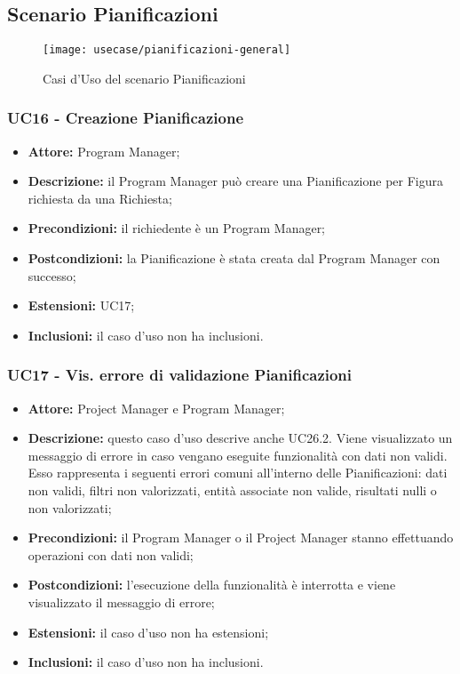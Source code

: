 \subsection{Scenario Pianificazioni}
\begin{figure}[H] 
	\centering
    \texttt{[image: usecase/pianificazioni-general]} 
    \caption{Casi d'Uso del scenario Pianificazioni}
\end{figure}

\subsubsection*{UC16 - Creazione Pianificazione}
\begin{itemize}[label=$\circ$]
\item \textbf{Attore:} Program Manager;
\item \textbf{Descrizione:} il Program Manager può creare una Pianificazione per Figura richiesta da una Richiesta;
\item \textbf{Precondizioni:} il richiedente è un Program Manager;
\item \textbf{Postcondizioni:} la Pianificazione è stata creata dal Program Manager con successo;
\item \textbf{Estensioni:} UC17;
\item \textbf{Inclusioni:} il caso d'uso non ha inclusioni.
\end{itemize}

\subsubsection*{UC17 - Vis. errore di validazione Pianificazioni}
\begin{itemize}[label=$\circ$]
\item \textbf{Attore:} Project Manager e Program Manager;
\item \textbf{Descrizione:} questo caso d'uso descrive anche UC26.2. Viene visualizzato un messaggio di errore in caso vengano eseguite funzionalità con dati non validi. Esso rappresenta i seguenti errori comuni all'interno delle Pianificazioni: dati non validi, filtri non valorizzati, entità associate non valide, risultati nulli o non valorizzati;
\item \textbf{Precondizioni:} il Program Manager o il Project Manager stanno effettuando operazioni con dati non validi;
\item \textbf{Postcondizioni:} l'esecuzione della funzionalità è interrotta e viene visualizzato il messaggio di errore;
\item \textbf{Estensioni:} il caso d'uso non ha estensioni;
\item \textbf{Inclusioni:} il caso d'uso non ha inclusioni.
\end{itemize}

